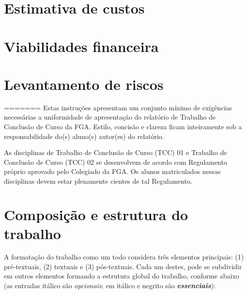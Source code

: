 \section{Estimativa de custos}
\section{Viabilidades financeira}
\section{Levantamento de riscos}
=======
Estas instruções apresentam um conjunto mínimo de exigências necessárias a 
uniformidade de apresentação do relatório de Trabalho de Conclusão de Curso 
da FGA. Estilo, concisão e clareza ficam inteiramente sob a 
responsabilidade do(s) aluno(s) autor(es) do relatório.

As disciplinas de Trabalho de Conclusão de Curso (TCC) 01 e Trabalho de 
Conclusão de Curso (TCC) 02 se desenvolvem de acordo com Regulamento 
próprio aprovado pelo Colegiado da FGA. Os alunos matriculados nessas 
disciplinas devem estar plenamente cientes de tal Regulamento. 

\section{Composição e estrutura do trabalho}

A formatação do trabalho como um todo considera três elementos principais: 
(1) pré-textuais, (2) textuais e (3) pós-textuais. Cada um destes, pode se 
subdividir em outros elementos formando a estrutura global do trabalho, 
conforme abaixo (as entradas itálico são \textit{opcionais}; em itálico e
negrito são \textbf{\textit{essenciais}}):

